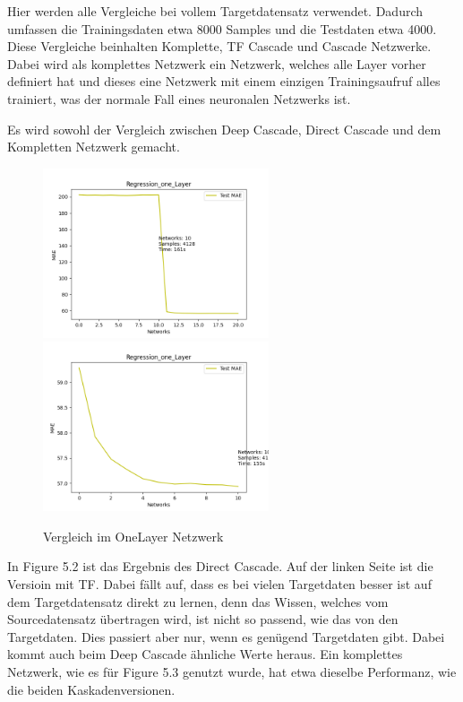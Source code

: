 Hier werden alle Vergleiche bei vollem Targetdatensatz verwendet. 
Dadurch umfassen die Trainingsdaten etwa 8000 Samples und die Testdaten etwa 4000. 
Diese Vergleiche beinhalten Komplette, TF Cascade und Cascade Netzwerke. Dabei wird als komplettes Netzwerk ein Netzwerk, welches alle 
Layer vorher definiert hat und dieses eine Netzwerk mit einem einzigen Trainingsaufruf alles trainiert, was der normale Fall eines 
neuronalen Netzwerks ist. 

Es wird sowohl der Vergleich zwischen Deep Cascade, Direct Cascade und dem Kompletten Netzwerk gemacht.  

\begin{figure}[htpb]
    \includegraphics[height=5cm]{../../Plots/ba_plots/regression_large/onelayer_ts.png}
    \includegraphics[height=5cm]{../../Plots/ba_plots/regression_large/woonelayer_ts.png}
    \caption{\label{fig:largeregr2} Vergleich im OneLayer Netzwerk}
\end{figure}

In Figure 5.2 ist das Ergebnis des Direct Cascade. Auf der linken Seite ist die Versioin mit TF. Dabei fällt auf, dass es bei vielen 
Targetdaten besser ist auf dem Targetdatensatz direkt zu lernen, denn 
das Wissen, welches vom Sourcedatensatz übertragen wird, ist nicht so passend, wie das von den Targetdaten. Dies passiert aber nur, wenn es 
genügend Targetdaten gibt. Dabei kommt auch beim Deep Cascade ähnliche Werte heraus. 
Ein komplettes Netzwerk, wie es für Figure 5.3 genutzt wurde, hat etwa dieselbe Performanz, wie die beiden Kaskadenversionen. 

